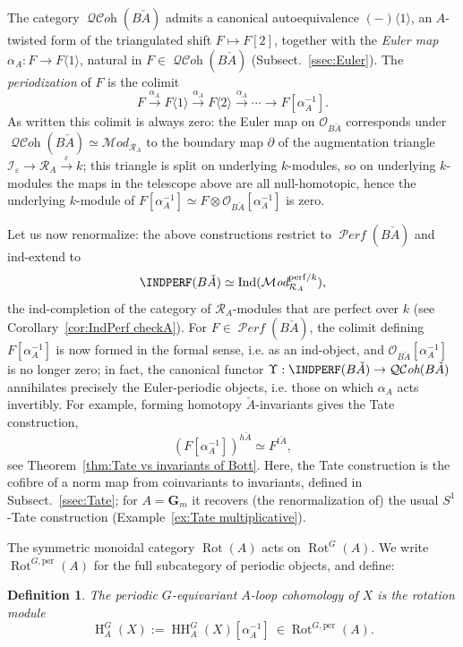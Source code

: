 \documentclass[12pt, oneside]{amsart}
\numberwithin{equation}{section}
\newtheorem{definition}[subsubsection]{Definition}
\theoremstyle{remark}
\theoremstyle{plain}
\newcommand{\MOD}{\mathcal{M}\textit{od}}
\DeclareMathOperator{\QCOH}{\mathcal{QC}\textit{oh}}
\DeclareMathOperator{\PERF}{\mathcal{P}\textit{erf}}
\newcommand{\R}{\mathcal{R}}
\newcommand{\RA}{\R_A}
\newcommand{\OO}{\mathcal{O}}
\newcommand{\GGm}{\mathbf{G}_{m}}
\newcommand{\Ind}{\operatorname{Ind}}
\newcommand{\Ren}{\Upsilon}
\newcommand{\HH}{\operatorname{HH}}
\newcommand{\Hcoh}{\operatorname{H}}
\newcommand{\Thom}[1]{\langle #1 \rangle}
\newcommand{\eps}{\varepsilon}
\newcommand{\Rot}{\operatorname{Rot}}
\begin{document}
The category $\QCOH(B\check{A})$ admits a canonical autoequivalence $(-)\Thom{1}$, an $A$-twisted form of the triangulated shift $F \mapsto F[2]$, together with the \emph{Euler map} $\alpha_A : F \to F\Thom{1}$, natural in $F \in \QCOH(B\check{A})$ (Subsect.~\ref{ssec:Euler}).
The \emph{periodization} of $F$ is the colimit
\[
  F \xrightarrow{\alpha_A}
  F\Thom{1} \xrightarrow{\alpha_A}
  F\Thom{2} \xrightarrow{\alpha_A}
  \cdots
  \to F[\alpha_A^{-1}].
\]
As written this colimit is always zero: the Euler map on $\OO_{B\check{A}}$ corresponds under $\QCOH(B\check{A}) \simeq \MOD_{\RA}$ to the boundary map $\partial$ of the augmentation triangle $\mathcal{I}_\eps \to \RA \xrightarrow{\eps} k$; this triangle is split on underlying $k$-modules, so on underlying $k$-modules the maps in the telescope above are all null-homotopic, hence the underlying $k$-module of $F[\alpha_A^{-1}] \simeq F \otimes \OO_{B\check{A}}[\alpha_A^{-1}]$ is zero.

Let us now renormalize: the above constructions restrict to $\PERF(B\check{A})$ and ind-extend to
\[ \INDPERF(B\check{A}) \simeq \Ind(\MOD_{\RA}^{\mathrm{perf}/k}), \]
the ind-completion of the category of $\RA$-modules that are perfect over $k$ (see Corollary~\ref{cor:IndPerf checkA}).
For $F \in \PERF(B\check{A})$, the colimit defining $F[\alpha_A^{-1}]$ is now formed in the formal sense, i.e. as an ind-object, and $\OO_{B\check{A}}[\alpha_A^{-1}]$ is no longer zero; in fact, the canonical functor $\Ren : \INDPERF(B\check{A}) \to \QCOH(B\check{A})$ annihilates precisely the Euler-periodic objects, i.e. those on which $\alpha_A$ acts invertibly.
For example, forming homotopy $\check{A}$-invariants gives the Tate construction,
\[ (F[\alpha_A^{-1}])^{h\check{A}} \simeq F^{t\check{A}}, \]
see Theorem~\ref{thm:Tate vs invariants of Bott}.
Here, the Tate construction is the cofibre of a norm map from coinvariants to invariants, defined in Subsect.~\ref{ssec:Tate}; for $A=\GGm$ it recovers (the renormalization of) the usual $S^1$-Tate construction (Example~\ref{ex:Tate multiplicative}).

The symmetric monoidal category $\Rot(A)$ acts on $\Rot^G(A)$.
We write $\Rot^{G,\mathrm{per}}(A)$ for the full subcategory of periodic objects, and define:

\begin{definition}
	The \emph{periodic $G$-equivariant $A$-loop cohomology} of $X$ is the rotation module
	\[ \Hcoh_A^G(X) := \HH_A^G(X)[\alpha_A^{-1}] \ \in \Rot^{G,\mathrm{per}}(A). \]
\end{definition}
\end{document}
